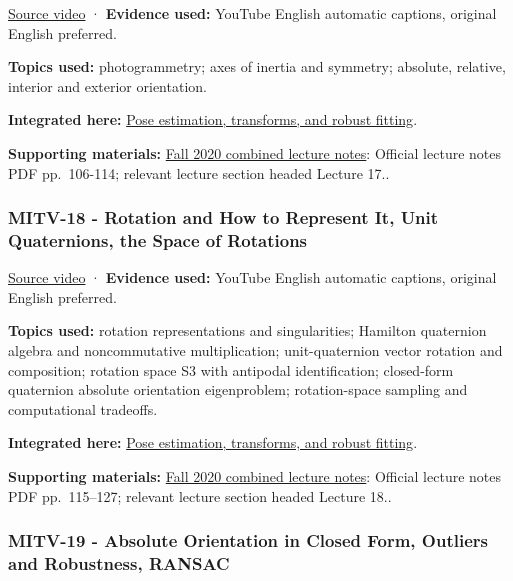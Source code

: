 \href{https://www.youtube.com/watch?v=R8O0vlHBeNc}{Source video} · \textbf{Evidence used:} YouTube English automatic captions, original English preferred.

\textbf{Topics used:} photogrammetry; axes of inertia and symmetry; absolute, relative, interior and exterior orientation.

\textbf{Integrated here:} \hyperref[04-visual-computing-ii-ch032-pose-estimation-transforms-and-robust-fitting]{Pose estimation, transforms, and robust fitting}.

\textbf{Supporting materials:} \href{https://ocw.mit.edu/courses/6-801-machine-vision-fall-2020/9ec44f69e72995c370b3797818ba01e6_MIT6_801F20_lectureNotes.pdf}{Fall 2020 combined lecture notes}: Official lecture notes PDF pp.~106-114; relevant lecture section headed Lecture 17..

\subsubsection{MITV-18 - Rotation and How to Represent It, Unit Quaternions, the Space of Rotations}\label{04-visual-computing-ii-ch036-mitv-18---rotation-and-how-to-represent-it-unit-quaternions-the-space-of-rotations}

\hypertarget{04-visual-computing-ii-ch036-mitv-18---rotation-and-how-to-represent-it-unit-quaternions-the-space-of-rotations}{}

\href{https://www.youtube.com/watch?v=uiG6KY0Cqd8}{Source video} · \textbf{Evidence used:} YouTube English automatic captions, original English preferred.

\textbf{Topics used:} rotation representations and singularities; Hamilton quaternion algebra and noncommutative multiplication; unit-quaternion vector rotation and composition; rotation space S3 with antipodal identification; closed-form quaternion absolute orientation eigenproblem; rotation-space sampling and computational tradeoffs.

\textbf{Integrated here:} \hyperref[04-visual-computing-ii-ch032-pose-estimation-transforms-and-robust-fitting]{Pose estimation, transforms, and robust fitting}.

\textbf{Supporting materials:} \href{https://ocw.mit.edu/courses/6-801-machine-vision-fall-2020/9ec44f69e72995c370b3797818ba01e6_MIT6_801F20_lectureNotes.pdf}{Fall 2020 combined lecture notes}: Official lecture notes PDF pp.~115--127; relevant lecture section headed Lecture 18..

\subsubsection{MITV-19 - Absolute Orientation in Closed Form, Outliers and Robustness, RANSAC}\label{04-visual-computing-ii-ch036-mitv-19---absolute-orientation-in-closed-form-outliers-and-robustness-ransac}

